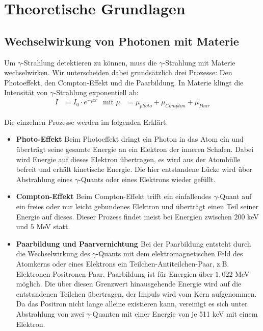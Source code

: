 \section{Theoretische Grundlagen}
\cite{anleitung}
\subsection{Wechselwirkung von Photonen mit Materie}

Um $\gamma$-Strahlung detektieren zu können, muss die $\gamma$-Strahlung mit Materie wechselwirken. Wir unterscheiden dabei grundsätzlich drei Prozesse: Den Photoeffekt, den Compton-Effekt und die Paarbildung. In Materie klingt die Intensität von $\gamma$-Strahlung exponentiell ab:
\begin{align}
I&= I_0\cdot e^{-\mu x}
&\text{mit } 
\mu &= \mu_{photo} + \mu_{Compton} + \mu_{Paar}
\end{align}

Die einzelnen Prozesse werden im folgenden Erklärt.\cite{demtroeder}

\begin{itemize}
\item \textbf{Photo-Effekt}
Beim Photoeffekt dringt ein Photon in das Atom ein und überträgt seine gesamte Energie an ein Elektron der inneren Schalen. Dabei wird Energie auf dieses Elektron übertragen, es wird aus der Atomhülle befreit und erhält kinetische Energie. Die hier entstandene Lücke wird über Abstrahlung eines $\gamma$-Quants oder eines Elektrons wieder gefüllt.

\item\textbf{Compton-Effekt}
Beim Compton-Effekt trifft ein einfallendes $\gamma$-Quant auf ein freies oder nur leicht gebundenes Elektron und überträgt einen Teil seiner Energie auf dieses. Dieser Prozess findet meist bei Energien zwischen $200$ keV und $5$ MeV statt.

\item\textbf{Paarbildung und Paarvernichtung \label{PVN1}}
Bei der Paarbildung entsteht durch die Wechselwirkung des $\gamma$-Quants mit dem elektromagnetischen Feld des Atomkerns oder eines Elektrons ein Teilchen-Antiteilchen-Paar, z.B. Elektronen-Positronen-Paar. Paarbildung ist für Energien über $1,022$ MeV möglich. Die über diesen Grenzwert hinausgehende Energie wird auf die entstandenen Teilchen übertragen, der Impuls wird vom Kern aufgenommen. Da das Positron nicht lange alleine existieren kann, vereinigt es sich unter Abstrahlung von zwei $\gamma$-Quanten mit einer Energie von je 511 keV mit einem Elektron.
\end{itemize}


